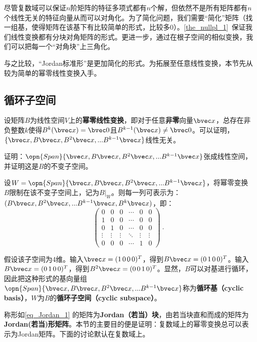 
尽管复数域可以保证$n$阶矩阵的特征多项式都有$n$个解，但依然不是所有矩阵都有$n$个线性无关的特征向量从而可以对角化。为了简化问题，我们需要“简化”矩阵（找一组基，使得矩阵在该基下有比较简单的形式，比较多$0$）。\autoref{the_nullpl_1}~保证我们线性变换都有分块对角矩阵的形式。更进一步，通过在根子空间的相似变换，我们可以把每一个“对角块”上三角化。

与之比较，“Jordan标准形”是更加简化的形式。为拓展至任意线性变换，本节先从较为简单的幂零线性变换入手。
\subsection{循环子空间}
设矩阵$B$为线性空间$V$上的\textbf{幂零线性变换}，即对于任意\textbf{非零}向量$\bvec x$，总存在非负整数$k$使得$B^{k}(\bvec x)=\bvec 0$且$B^{k-1}(\bvec x)\neq \bvec 0$。可以证明，$\{\bvec x,B\bvec x,B^2\bvec x,...B^{k-1}\bvec x\}$线性无关。
\begin{exercise}{}
证明：$\opn{Span}\{\bvec x,B\bvec x,B^2\bvec x,...B^{k-1}\bvec x\}$张成线性空间，并证明这是$B$的不变子空间。
\end{exercise}
设$W=\opn{Span}\{\bvec x,B\bvec x,B^2\bvec x,...B^{k-1}\bvec x\}$，将幂零变换$B$限制在该不变子空间上，记为$B|_W$。则每一列可表示为：$(B\bvec x,B^2\bvec x,...B^{k-1}\bvec x,B^k\bvec x)$，即：
\begin{equation}\label{eq_Jordan_1}
\left(\begin{array}{cccccc}
0 & 0 & 0 & \cdots & 0 & 0 \\
1 & 0 & 0 & \cdots & 0 & 0 \\
0 & 1 & 0 & \cdots & 0 & 0 \\
\vdots & \vdots & \vdots & \ddots & \vdots & \vdots \\
0 & 0 & 0 & \cdots & 1 & 0
\end{array}\right)~.
\end{equation}

假设该子空间为4维。输入$\bvec x=(1\,0\,0\,0)^T$，得到$B\bvec x=(0\,1\,0\,0)^T$。输入$B\bvec x=(0\,1\,0\,0)^T$，得到$B^2\bvec x=(0\,0\,1\,0)^T$。显然，$B$可以对基进行循环，因此把这种形式的基向量组$\opn{Span}\{\bvec x,B\bvec x,B^2\bvec x,...B^{k-1}\bvec x\}$称为\textbf{循环基（cyclic basis）}，$W$为$B$的\textbf{循环子空间（cyclic subspace）}。

称形如\autoref{eq_Jordan_1} 的矩阵为\textbf{Jordan（若当）块}，由若当块直和而成的矩阵为\textbf{ Jordan(若当)形矩阵}。本节的主要目的便是证明：复数域上的幂零变换总可以表示为Jordan矩阵。下面的讨论默认在复数域上。



